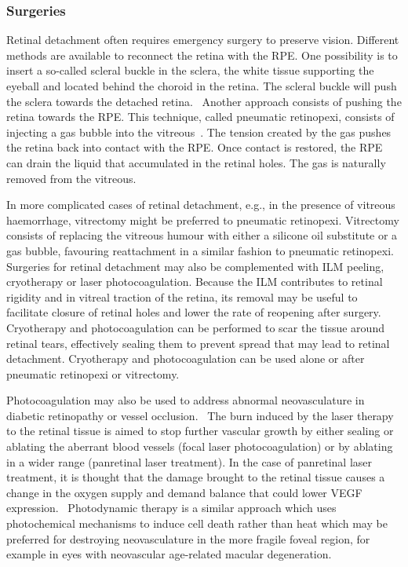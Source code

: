 \documentclass[12pt,a4paper]{journal}
\begin{document}
\subsubsection*{Surgeries}

Retinal detachment often requires emergency surgery to preserve vision.
Different methods are available to reconnect the retina with the RPE.
One possibility is to insert a so-called scleral buckle in the sclera, the white tissue supporting the eyeball and located behind the choroid in the retina.
The scleral buckle will push the sclera towards the detached retina.~\cite{Sodhi_2008}
Another approach consists of pushing the retina towards the RPE.
This technique, called pneumatic retinopexi, consists of injecting a gas bubble into the vitreous~\cite{Sodhi_2008}.
The tension created by the gas pushes the retina back into contact with the RPE.
Once contact is restored, the RPE can drain the liquid that accumulated in the retinal holes.
The gas is naturally removed from the vitreous.

In more complicated cases of retinal detachment, e.g., in the presence of vitreous haemorrhage, vitrectomy might be preferred to pneumatic retinopexi.
Vitrectomy consists of replacing the vitreous humour with either a silicone oil substitute or a gas bubble, favouring reattachment in a similar fashion to pneumatic retinopexi.~\cite{Dervenis_2022}
Surgeries for retinal detachment may also be complemented with ILM peeling, cryotherapy or laser photocoagulation.
Because the ILM contributes to retinal rigidity and in vitreal traction of the retina, its removal may be useful to facilitate closure of retinal holes and lower the rate of reopening after surgery.~\cite{Chatziralli_2018}
Cryotherapy and photocoagulation can be performed to scar the tissue around retinal tears, effectively sealing them to prevent spread that may lead to retinal detachment.
Cryotherapy and photocoagulation can be used alone or after pneumatic retinopexi or vitrectomy.~\cite{Sodhi_2008}

Photocoagulation may also be used to address abnormal neovasculature in diabetic retinopathy or vessel occlusion.~\cite{Evans_2014}
The burn induced by the laser therapy to the retinal tissue is aimed to stop further vascular growth by either sealing or ablating the aberrant blood vessels (focal laser photocoagulation) or by ablating in a wider range (panretinal laser treatment).
In the case of panretinal laser treatment, it is thought that the damage brought to the retinal tissue causes a change in the oxygen supply and demand balance that could lower VEGF expression.~\cite{Evans_2014}
Photodynamic therapy is a similar approach which uses photochemical mechanisms to induce cell death rather than heat which may be preferred for destroying neovasculature in the more fragile foveal region, for example in eyes with neovascular age-related macular degeneration.~\cite{SchmidtErfurth_2000}
\end{document}
